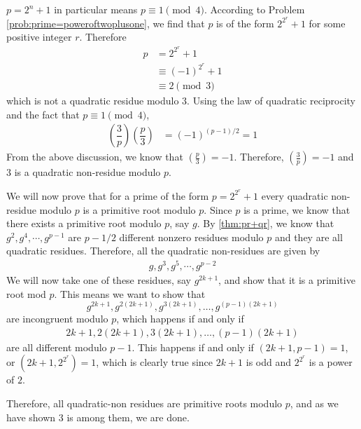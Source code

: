 \documentclass{subfile}
\begin{document}
	\begin{solution}[1]
		$p=2^n+1$ in particular means $p \equiv 1 \pmod{4}$.
		According to Problem \ref{prob:prime=poweroftwoplusone}, we find that $p$ is of the form $2^{2^r} + 1$ for some positive integer $r$. Therefore
			\begin{align*}
				p
					& = 2^{2^{r}} +1\\
					& \equiv (-1)^{2^r} +1\\
					& \equiv 2 \pmod{3}
			\end{align*}
		which is not a quadratic residue modulo $3$.
		Using the law of quadratic reciprocity and the fact that $p \equiv 1 \pmod{4}$,
			\begin{align*}
				\left(\dfrac{3}{p}\right) \left(\dfrac{p}{3}\right)
					& = (-1)^{(p-1)/2} = 1
			\end{align*}
		From the above discussion, we know that $\left( \frac{p}{3} \right) = -1$. Therefore, $\left(\frac{3}{p}\right)=-1$ and $3$ is a quadratic non-residue modulo $p$.

		We will now prove that for a prime of the form $p=2^{2^{r}}+1$ every quadratic non-residue modulo $p$ is a primitive root modulo $p$. Since $p$ is a prime, we know that there exists a primitive root modulo $p$, say $g$. By \autoref{thm:pr+qr}, we know that $g^2,g^4,\cdots,g^{p-1}$ are ${p-1}/{2}$ different nonzero residues modulo $p$ and they are all quadratic residues. Therefore, all the quadratic non-residues are given by
			\begin{align*}
				g,g^3,g^5,\cdots,g^{p-2}
			\end{align*}
		We will now take one of these residues, say $g^{2k+1}$, and show that it is a primitive root mod ${p}$. This means we want to show that $$g^{2k+1},g^{2(2k+1)},g^{3(2k+1)},\ldots,g^{(p-1)(2k+1)}$$ are incongruent modulo $p$, which  happens if and only if
			\begin{align*}
				2k+1,2(2k+1),3(2k+1),\ldots,(p-1)(2k+1)
			\end{align*}
		are all different modulo ${p-1}$. This happens if and only if $(2k+1,p-1)=1$, or $(2k+1,2^{2^r})=1$, which is clearly true since $2k+1$ is odd and $2^{2^{r}}$ is a power of $2$.

		Therefore, all quadratic-non residues are primitive roots modulo $p$, and as we have shown $3$ is among them, we are done.
	\end{solution}
\end{document}
